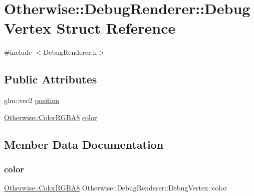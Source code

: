 \hypertarget{struct_otherwise_1_1_debug_renderer_1_1_debug_vertex}{}\section{Otherwise\+:\+:Debug\+Renderer\+:\+:Debug\+Vertex Struct Reference}
\label{struct_otherwise_1_1_debug_renderer_1_1_debug_vertex}


{\ttfamily \#include $<$Debug\+Renderer.\+h$>$}

\subsection*{Public Attributes}
\begin{DoxyCompactItemize}
\item 
glm\+::vec2 \hyperlink{struct_otherwise_1_1_debug_renderer_1_1_debug_vertex_a9cb6e7188f331e3991a45c1ffe2658fc}{position}
\item 
\hyperlink{struct_otherwise_1_1_color_r_g_b_a8}{Otherwise\+::\+Color\+R\+G\+B\+A8} \hyperlink{struct_otherwise_1_1_debug_renderer_1_1_debug_vertex_affeb16cb0fd16015a1801bd3e0abe9df}{color}
\end{DoxyCompactItemize}


\subsection{Member Data Documentation}
\mbox{\label{struct_otherwise_1_1_debug_renderer_1_1_debug_vertex_affeb16cb0fd16015a1801bd3e0abe9df}} 
\subsubsection{\texorpdfstring{color}{color}}
{\footnotesize\ttfamily \hyperlink{struct_otherwise_1_1_color_r_g_b_a8}{Otherwise\+::\+Color\+R\+G\+B\+A8} Otherwise\+::\+Debug\+Renderer\+::\+Debug\+Vertex\+::color}

\mbox{\label{struct_otherwise_1_1_debug_renderer_1_1_debug_vertex_a9cb6e7188f331e3991a45c1ffe2658fc}} 
